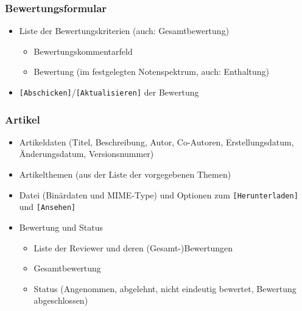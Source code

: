 \documentclass[headexclude,footexclude,12pt,BCOR0pt,DIV15]{scrartcl}
\begin{document}
        \subsubsection{Bewertungsformular}
        \begin{itemize}
            \item Liste der Bewertungskriterien (auch: Gesamtbewertung)
            \begin{itemize}
                \item Bewertungskommentarfeld
                \item Bewertung (im festgelegten Notenspektrum, auch: Enthaltung)
            \end{itemize}
            \item \texttt{[Abschicken]}/\texttt{[Aktualisieren]} der Bewertung
        \end{itemize}

        \subsubsection{Artikel}
        \begin{itemize}
            \item Artikeldaten (Titel, Beschreibung, Autor, Co-Autoren, Erstellungsdatum, \"{A}nderungsdatum, Versionsnummer)
            \item Artikelthemen (aus der Liste der vorgegebenen Themen)
            \item Datei (Bin\"{a}rdaten und MIME-Type) und Optionen zum \texttt{[Herunterladen]} und \texttt{[Ansehen]}
            \item Bewertung und Status
            \begin{itemize}
                \item Liste der Reviewer und deren (Gesamt-)Bewertungen
                \item Gesamtbewertung
                \item Status (Angenommen, abgelehnt, nicht eindeutig bewertet, Bewertung abgeschlossen)
            \end{itemize}
        \end{itemize}

\pagebreak
\end{document}

